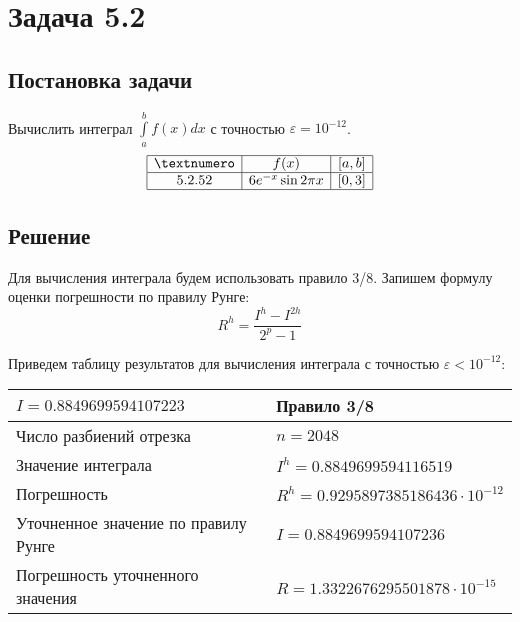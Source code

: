 \section*{Задача 5.2}
\subsection*{Постановка задачи}
Вычислить интеграл $ \int\limits_a^bf(x)dx $ с точностью $\varepsilon = 10^{-12}$.
\[
\begin{array}{| c | c | c |}
	\hline
	№ & f(x) & [a, b] \\ \hline
	5.2.52 & 6e^{-x}\sin{2\pi x} & [0, 3] \\ \hline
\end{array}
\]
\subsection*{Решение}
Для вычисления интеграла будем использовать правило 3/8. Запишем формулу оценки погрешности по правилу Рунге:
\[
	R^h = \dfrac{I^h - I^{2h}}{2^p - 1}
\]

Приведем таблицу результатов для вычисления интеграла с точностью $\varepsilon < 10^{-12}$:

\begin{tabular}{| p{7.5cm} | p{7.5cm} |}
	\hline
	$I = 0.8849699594107223$ & Правило 3/8 \\ \hline
	Число разбиений отрезка	& $n = 2048$ \\ \hline
	Значение интеграла & $I^h = 0.8849699594116519$ \\ \hline
	Погрешность & $R^h = 0.9295897385186436 \cdot 10^{-12}$ \\ \hline
	Уточненное значение по правилу Рунге & $I = 0.8849699594107236$\\ \hline
	Погрешность уточненного значения & $R = 1.3322676295501878 \cdot 10^{-15}$\\ \hline
\end{tabular}